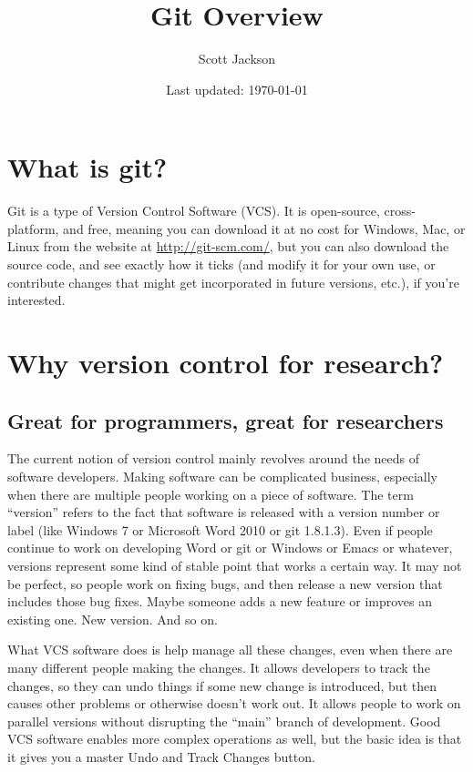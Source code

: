 \documentclass[11pt]{article}
\title{Git Overview}
\author{Scott Jackson}
\date{Last updated: \today}
\begin{document}
\maketitle

\setcounter{tocdepth}{3}
\tableofcontents
\vspace*{1cm}

\section{What is git?}
\label{sec-1}

Git is a type of Version Control Software (VCS). It is open-source, cross-platform, and free, meaning you can download it at no cost for Windows, Mac, or Linux from the website at \href{http://git-scm.com/}{http://git-scm.com/}, but you can also download the source code, and see exactly how it ticks (and modify it for your own use, or contribute changes that might get incorporated in future versions, etc.), if you're interested.
\section{Why version control for research?}
\label{sec-2}
\subsection{Great for programmers, great for researchers}
\label{sec-2-1}

The current notion of version control mainly revolves around the needs of software developers. Making software can be complicated business, especially when there are multiple people working on a piece of software.  The term ``version'' refers to the fact that software is released with a version number or label (like Windows 7 or Microsoft Word 2010 or git 1.8.1.3). Even if people continue to work on developing Word or git or Windows or Emacs or whatever, versions represent some kind of stable point that works a certain way.  It may not be perfect, so people work on fixing bugs, and then release a new version that includes those bug fixes.  Maybe someone adds a new feature or improves an existing one.  New version.  And so on.

What VCS software does is help manage all these changes, even when there are many different people making the changes. It allows developers to track the changes, so they can undo things if some new change is introduced, but then causes other problems or otherwise doesn't work out. It allows people to work on parallel versions without disrupting the ``main'' branch of development.  Good VCS software enables more complex operations as well, but the basic idea is that it gives you a master Undo and Track Changes button.
\end{document}

